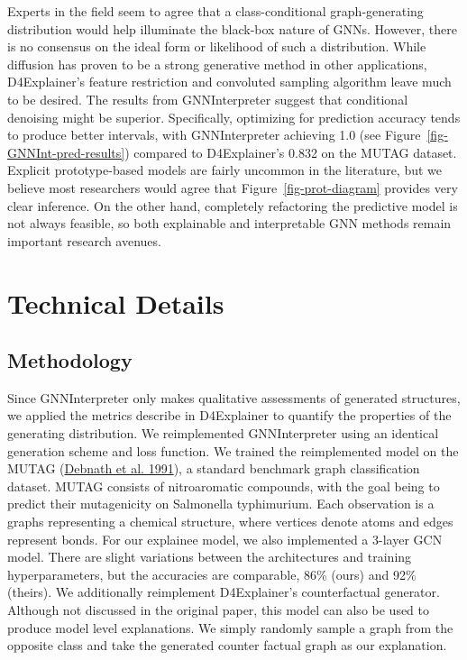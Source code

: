 \documentclass[
  11pt,
  letterpaper,
]{article}
\begin{document}
\quad Experts in the field seem to agree that a class-conditional
graph-generating distribution would help illuminate the black-box nature
of GNNs. However, there is no consensus on the ideal form or likelihood
of such a distribution. While diffusion has proven to be a strong
generative method in other applications, D4Explainer's feature
restriction and convoluted sampling algorithm leave much to be desired.
The results from GNNInterpreter suggest that conditional denoising might
be superior. Specifically, optimizing for prediction accuracy tends to
produce better intervals, with GNNInterpreter achieving 1.0 (see
Figure~\ref{fig-GNNInt-pred-results}) compared to D4Explainer's 0.832 on
the MUTAG dataset. Explicit prototype-based models are fairly uncommon
in the literature, but we believe most researchers would agree that
Figure~\ref{fig-prot-diagram} provides very clear inference. On the
other hand, completely refactoring the predictive model is not always
feasible, so both explainable and interpretable GNN methods remain
important research avenues.

\hypertarget{technical-details}{%
\section{Technical Details}\label{technical-details}}

\hypertarget{methodology}{%
\subsection{Methodology}\label{methodology}}

\quad Since GNNInterpreter only makes qualitative assessments of
generated structures, we applied the metrics describe in D4Explainer to
quantify the properties of the generating distribution. We reimplemented
GNNInterpreter using an identical generation scheme and loss function.
We trained the reimplemented model on the MUTAG
(\protect\hyperlink{ref-Debnath_1991}{Debnath et al. 1991}), a standard
benchmark graph classification dataset. MUTAG consists of nitroaromatic
compounds, with the goal being to predict their mutagenicity on
Salmonella typhimurium. Each observation is a graphs representing a
chemical structure, where vertices denote atoms and edges represent
bonds. For our explainee model, we also implemented a 3-layer GCN model.
There are slight variations between the architectures and training
hyperparameters, but the accuracies are comparable, 86\% (ours) and 92\%
(theirs). We additionally reimplement D4Explainer's counterfactual
generator. Although not discussed in the original paper, this model can
also be used to produce model level explanations. We simply randomly
sample a graph from the opposite class and take the generated counter
factual graph as our explanation.
\end{document}
